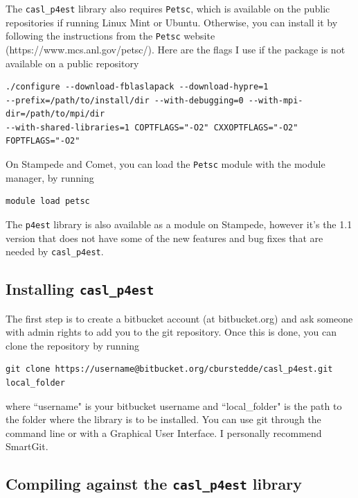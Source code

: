 \documentclass{article}
\begin{document}
The \texttt{casl\_p4est} library also requires \texttt{Petsc}, which is available on the public repositories if running Linux Mint or Ubuntu. Otherwise, you can install it by following the instructions from the \texttt{Petsc} website (https://www.mcs.anl.gov/petsc/). Here are the flags I use if the package is not available on a public repository
\begin{Verbatim}[frame=single]
./configure --download-fblaslapack --download-hypre=1
--prefix=/path/to/install/dir --with-debugging=0 --with-mpi-dir=/path/to/mpi/dir
--with-shared-libraries=1 COPTFLAGS="-O2" CXXOPTFLAGS="-O2" FOPTFLAGS="-O2"
\end{Verbatim}

On Stampede and Comet, you can load the \texttt{Petsc} module with the module manager, by running
\begin{Verbatim}[frame=single]
module load petsc
\end{Verbatim}
The \texttt{p4est} library is also available as a module on Stampede, however it's the 1.1 version that does not have some of the new features and bug fixes that are needed by \texttt{casl\_p4est}.

\subsection{Installing \texttt{casl\_p4est}}

The first step is to create a bitbucket account (at bitbucket.org) and ask someone with admin rights to add you to the git repository. Once this is done, you can clone the repository by running
\begin{Verbatim}[frame=single]
git clone https://username@bitbucket.org/cburstedde/casl_p4est.git local_folder
\end{Verbatim}
where ``username" is your bitbucket username and ``local\_folder" is the path to the folder where the library is to be installed. You can use git through the command line or with a Graphical User Interface. I personally recommend SmartGit.

\subsection{Compiling against the \texttt{casl\_p4est} library}
\end{document}
